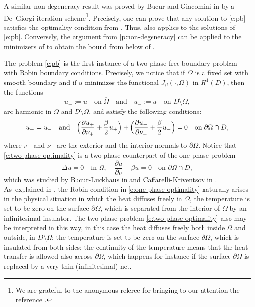 A similar non-degeneracy result was proved by Bucur and Giacomini in \cite{bg} by a De~Giorgi iteration scheme\footnote{We are grateful to the anonymous referee for bringing to our attention the reference \cite{bg}.}. Precisely, one can prove that any solution to \eqref{e:pb} satisfies the optimality condition from \cite[Rem.\,3.7]{bg}. Thus, \cite[Th.\,3.5]{bg} also applies to the solutions of \eqref{e:pb}. Conversely, the argument from \ref{p:non-degeneracy} can be applied to the minimizers of \cite{bg} to obtain the bound from below of \cite[Th.\,3.5]{bg}.

The problem \eqref{e:pb} is the first instance of a two-phase free boundary problem with Robin boundary conditions. Precisely, we notice that if $\Omega$ is a fixed set with smooth boundary and if $u$ minimizes the functional $J_\beta(\cdot,\Omega)$ in $H^1(D)$, then the functions
\[u_+:=u\quad\text{on } \overline\Omega\quad\text{and}\quad u_-:=u\quad\text{on } D\setminus\Omega,\]
are harmonic in $\Omega$ and $D\setminus\overline\Omega$, and satisfy the following conditions:
\begin{equation}\label{e:two-phase-optimality}
u_+=u_-\quad\text{and}\quad\Bigl(\frac{\partial u_+}{\partial \nu_+}+\frac\beta2 u_+\Bigr)+\Bigl(\frac{\partial u_-}{\partial \nu_-}+\frac\beta2u_-\Bigr)=0\quad\text{on } \partial\Omega\cap D,
\end{equation}
where $\nu_+$ and $\nu_-$ are the exterior and the interior normals to $\partial\Omega$. Notice that \eqref{e:two-phase-optimality} is a two-phase counterpart of the one-phase problem
\begin{equation}\label{e:one-phase-optimality}
\Delta u=0\quad\text{in }\Omega,\quad \frac{\partial u}{\partial \nu}+\beta u=0\quad\text{on } \partial\Omega\cap D,
\end{equation}
which was studied by Bucur-Luckhaus in \cite{bl} and Caffarelli-Kriventsov in \cite{ck}. As~\hbox{explained} in \cite{ck}, the Robin condition in \eqref{e:one-phase-optimality} naturally arises in the physical situation in which the heat diffuses freely in $\Omega$, the temperature is set to be zero on the surface $\partial\Omega$, which is separated from the interior of $\Omega$ by an infinitesimal insulator. The two-phase problem \eqref{e:two-phase-optimality} also may be interpreted in this way, in this case the heat diffuses freely both inside $\Omega$ and outside, in $D\setminus\overline\Omega$; the temperature is set to be zero on the surface $\partial\Omega$, which is insulated from both sides; the continuity of the temperature means that the heat transfer is allowed also across $\partial\Omega$, which happens for instance if the surface $\partial\Omega$ is replaced by a very thin (infinitesimal) net.

